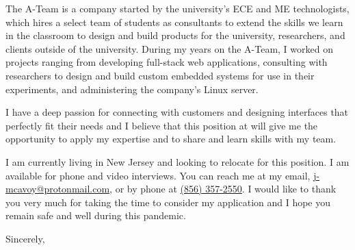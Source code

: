 \documentclass[11pt]{letter} %
\makeatletter
\newcommand{\myphonenumber}{\href{tel:+18563572550}{(856) 357-2550}}
\newcommand{\myemail}{\href{mailto:j-mcavoy@protonmail.com}{j-mcavoy@protonmail.com}}
\makeatother
\begin{document}
\begin{letter}
The A-Team is a company started by the university's ECE and ME technologists,
which hires a select team of students as consultants to extend the skills we
learn in the classroom to design and build products for the university,
researchers, and clients outside of the university. During my
years on the A-Team, I worked on projects ranging from developing full-stack web
applications, consulting with researchers to design and build custom embedded
systems for use in their experiments, and administering the company's Linux server.

{\lifestory}
I have a deep passion for connecting with customers and designing interfaces
that perfectly fit their needs and I believe that this position at {\company}
will give me the opportunity to apply my expertise and to share and learn
skills with my team.


I am currently living in New Jersey and looking to relocate for this position. I
am available for phone and video interviews. You can reach me at my email,
\myemail, or by phone at \myphonenumber. I would like to thank you very much for
taking the time to consider my application and I hope you remain safe and well
during this pandemic.

\closing{Sincerely,}



\end{letter}
\end{document}
